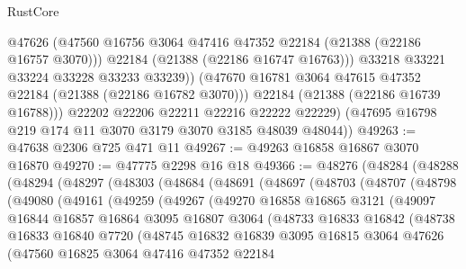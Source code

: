 \begin{lexlean}{RustCore}
\begin{coremodule}
                @47626
                (@47560 @16756 @3064 @47416 @47352 @22184 (@21388 (@22186 @16757 @3070)))
                @22184
                (@21388 (@22186 @16747 @16763)))
              @33218
              @33221
              @33224
              @33228
              @33233
              @33239))
          (@47670 @16781 @3064 @47615 @47352 @22184 (@21388 (@22186 @16782 @3070)))
          @22184
          (@21388 (@22186 @16739 @16788)))
        @22202
        @22206
        @22211
        @22216
        @22222
        @22229)
      (@47695 @16798 @219 @174 @11 @3070 @3179 @3070 @3185 @48039 @48044))
@49263 := @47638 @2306 @725 @471 @11
@49267 := @49263 @16858 @16867 @3070 @16870
@49270 := @47775 @2298 @16 @18
@49366 := @48276
    (@48284
      (@48288
        (@48294
          (@48297
            (@48303
              (@48684
                (@48691
                  (@48697
                    (@48703
                      (@48707
                        (@48798
                          (@49080
                            (@49161
                              (@49259
                                (@49267
                                  (@49270
                                    @16858
                                    @16865
                                    @3121
                                    (@49097
                                      @16844
                                      @16857
                                      @16864
                                      @3095
                                      @16807
                                      @3064
                                      (@48733
                                        @16833
                                        @16842
                                        (@48738
                                          @16833
                                          @16840
                                          @7720
                                          (@48745
                                            @16832
                                            @16839
                                            @3095
                                            @16815
                                            @3064
                                            @47626
                                            (@47560
                                              @16825
                                              @3064
                                              @47416
                                              @47352
                                              @22184

\end{coremodule}
\end{lexlean}

